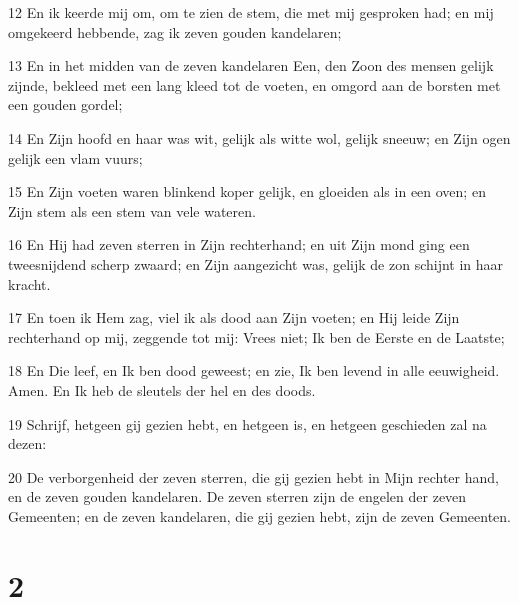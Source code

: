 \par 12 En ik keerde mij om, om te zien de stem, die met mij gesproken had; en mij omgekeerd hebbende, zag ik zeven gouden kandelaren;
\par 13 En in het midden van de zeven kandelaren Een, den Zoon des mensen gelijk zijnde, bekleed met een lang kleed tot de voeten, en omgord aan de borsten met een gouden gordel;
\par 14 En Zijn hoofd en haar was wit, gelijk als witte wol, gelijk sneeuw; en Zijn ogen gelijk een vlam vuurs;
\par 15 En Zijn voeten waren blinkend koper gelijk, en gloeiden als in een oven; en Zijn stem als een stem van vele wateren.
\par 16 En Hij had zeven sterren in Zijn rechterhand; en uit Zijn mond ging een tweesnijdend scherp zwaard; en Zijn aangezicht was, gelijk de zon schijnt in haar kracht.
\par 17 En toen ik Hem zag, viel ik als dood aan Zijn voeten; en Hij leide Zijn rechterhand op mij, zeggende tot mij: Vrees niet; Ik ben de Eerste en de Laatste;
\par 18 En Die leef, en Ik ben dood geweest; en zie, Ik ben levend in alle eeuwigheid. Amen. En Ik heb de sleutels der hel en des doods.
\par 19 Schrijf, hetgeen gij gezien hebt, en hetgeen is, en hetgeen geschieden zal na dezen:
\par 20 De verborgenheid der zeven sterren, die gij gezien hebt in Mijn rechter hand, en de zeven gouden kandelaren. De zeven sterren zijn de engelen der zeven Gemeenten; en de zeven kandelaren, die gij gezien hebt, zijn de zeven Gemeenten.

\chapter{2}

